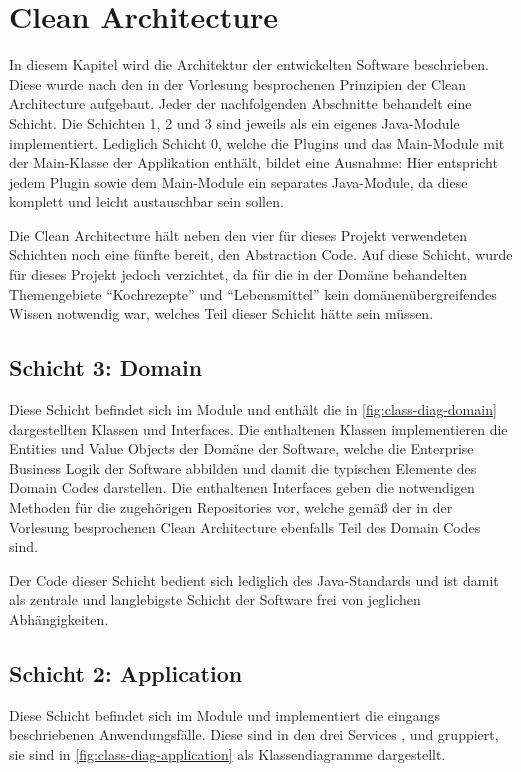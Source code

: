 \chapter{Clean Architecture}
In diesem Kapitel wird die Architektur der entwickelten Software beschrieben. Diese wurde nach den in der Vorlesung besprochenen Prinzipien der Clean Architecture aufgebaut. Jeder der nachfolgenden Abschnitte behandelt eine Schicht. Die Schichten 1, 2 und 3 sind jeweils als ein eigenes Java-Module implementiert. Lediglich Schicht 0, welche die Plugins und das Main-Module mit der Main-Klasse der Applikation enthält, bildet eine Ausnahme: Hier entspricht jedem Plugin sowie dem Main-Module ein separates Java-Module, da diese komplett und leicht austauschbar sein sollen.

Die Clean Architecture hält neben den vier für dieses Projekt verwendeten Schichten noch eine fünfte bereit, den Abstraction Code. Auf diese Schicht, wurde für dieses Projekt jedoch verzichtet, da für die in der Domäne behandelten Themengebiete \enquote{Kochrezepte} und \enquote{Lebensmittel} kein domänenübergreifendes Wissen notwendig war, welches Teil dieser Schicht hätte sein müssen. 

\section{Schicht 3: Domain}
Diese Schicht befindet sich im Module \href{https://github.com/anditru/quickie/tree/bb41442c7f1ffbfcd3117cd86a40f7932e543a33/3-quickie-domain}{} und enthält die in \autoref{fig:class-diag-domain} dargestellten Klassen und Interfaces. Die enthaltenen Klassen implementieren die Entities und Value Objects der Domäne der Software, welche die Enterprise Business Logik der Software abbilden und damit die typischen Elemente des Domain Codes darstellen. Die enthaltenen Interfaces geben die notwendigen Methoden für die zugehörigen Repositories vor, welche gemäß der in der Vorlesung besprochenen Clean Architecture ebenfalls Teil des Domain Codes sind.

Der Code dieser Schicht bedient sich lediglich des Java-Standards und ist damit als zentrale und langlebigste Schicht der Software frei von jeglichen Abhängigkeiten.

\section{Schicht 2: Application}
Diese Schicht befindet sich im Module \href{https://github.com/anditru/quickie/tree/bb41442c7f1ffbfcd3117cd86a40f7932e543a33/2-quickie-application}{} und implementiert die eingangs beschriebenen Anwendungsfälle. Diese sind in den drei Services ,  und  gruppiert, sie sind in \autoref{fig:class-diag-application} als Klassendiagramme dargestellt.

